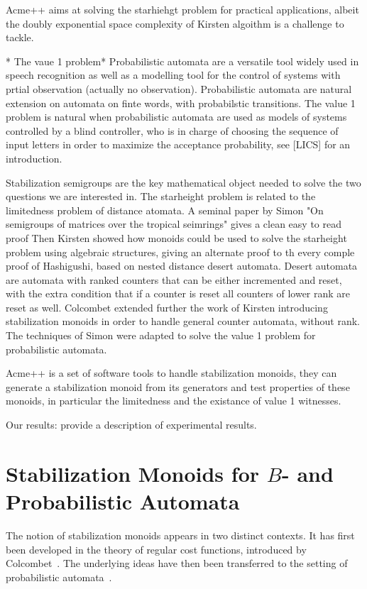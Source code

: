 \documentclass[11pt]{llncs}
\begin{document}
Acme++ aims at solving the starhiehgt  problem for practical applications,
albeit the doubly exponential space complexity of Kirsten algoithm is a challenge to tackle.

* The vaue 1 problem*
Probabilistic automata are a versatile tool widely used in speech recognition as well as a modelling tool 
for the control of systems with prtial observation (actually no observation).
Probabilistic automata are natural extension on automata on finte words,
with probabilstic transitions.
The value 1 problem is natural when  probabilistic automata are used as models
of systems controlled by a blind controller, who is in charge of choosing the
sequence of input letters in order to maximize the acceptance
probability, see [LICS] for an introduction.

Stabilization semigroups are the key mathematical object needed to solve the two questions we are interested in.
The starheight problem is related to the limitedness problem of distance atomata.
A seminal paper by Simon "On semigroups of matrices over the tropical seimrings"
gives a clean easy to read proof 
Then Kirsten showed how monoids could be used to solve the starheight problem using algebraic structures,
giving an alternate proof to th every comple proof of Hashigushi, based on nested distance desert automata.
Desert automata are automata with ranked counters that can be either incremented and reset,
with the extra condition that if a counter is reset all counters of lower rank are reset as well.
Colcombet extended further the work of Kirsten introducing stabilization monoids in order to handle
general counter automata, without rank.
The techniques of Simon were adapted to solve the value 1 problem for probabilistic automata.


Acme++ is a set of software tools to handle stabilization monoids, they can generate a stabilization monoid from its generators and test properties of these monoids, in particular the limitedness and the existance of value 1 witnesses.

Our results:
provide a description of experimental results.

\section{Stabilization Monoids for $B$- and Probabilistic Automata}

The notion of stabilization monoids appears in two distinct contexts.
It has first been developed in the theory of regular cost functions,
introduced by Colcombet~\cite{Colcombet09,Colcombet13}.
The underlying ideas have then been transferred to the setting of probabilistic automata~\cite{FGO12}.
\end{document}
